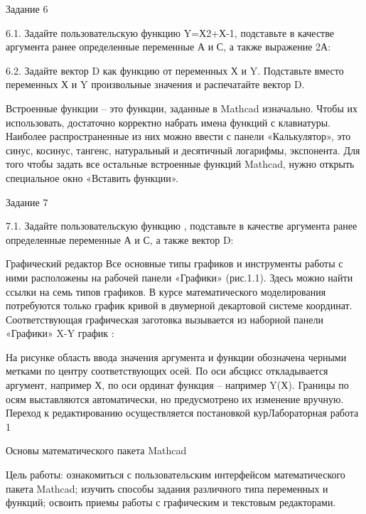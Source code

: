 Задание 6

6.1. Задайте пользовательскую функцию Y=Х2+Х-1, подставьте в качестве аргумента ранее определенные переменные А и С, а также выражение 2А:


6.2. Задайте вектор D как функцию от переменных Х и Y. Подставьте вместо переменных Х и Y произвольные значения и распечатайте вектор D.

		

Встроенные функции – это функции, заданные в Mathcad изначально. Чтобы их использовать, достаточно корректно набрать имена функций с клавиатуры. Наиболее распространенные из них можно ввести с панели «Калькулятор», это синус, косинус, тангенс, натуральный и десятичный логарифмы, экспонента. Для того чтобы задать все остальные встроенные функций Mathcad, нужно открыть специальное окно «Вставить функции».

Задание 7

7.1. Задайте пользовательскую функцию , 
подставьте в качестве аргумента ранее определенные переменные А и С, а также вектор D:


Графический редактор
Все основные типы графиков и инструменты работы с ними расположены на рабочей панели «Графики» (рис.1.1). Здесь можно найти ссылки на семь типов графиков. В курсе математического моделирования потребуются только график кривой в двумерной декартовой системе координат. Соответствующая графическая заготовка вызывается из наборной панели «Графики»  X-Y график :

 

На рисунке область ввода значения аргумента и функции обозначена черными метками по центру соответствующих осей. По оси абсцисс откладывается аргумент, например Х, по оси ординат функция – например Y(Х). Границы по осям выставляются автоматически, но предусмотрено их изменение вручную. Переход к редактированию осуществляется постановкой курЛабораторная работа 1

Основы математического пакета Mathcad

Цель работы: ознакомиться с пользовательским интерфейсом математического пакета Mathcad; изучить способы задания различного типа переменных и функций; освоить приемы работы с графическим и текстовым редакторами.

